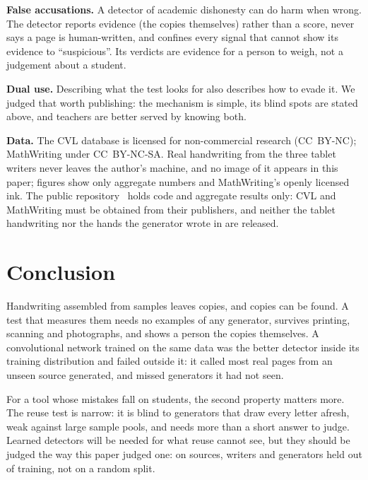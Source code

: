 \documentclass[conference]{IEEEtran}
\begin{document}
\textbf{False accusations.} A detector of academic dishonesty can do harm when wrong. The detector reports evidence
(the copies themselves) rather than a score, never says a page is human-written, and confines every signal that cannot
show its evidence to ``suspicious''. Its verdicts are evidence for a person to weigh, not a judgement about a student.

\textbf{Dual use.} Describing what the test looks for also describes how to evade it. We judged that worth publishing:
the mechanism is simple, its blind spots are stated above, and teachers are better served by knowing both.

\textbf{Data.} The CVL database is licensed for non-commercial research (CC~BY-NC); MathWriting under CC~BY-NC-SA. Real
handwriting from the three tablet writers never leaves the author's machine, and no image of it appears in this paper;
figures show only aggregate numbers and MathWriting's openly licensed ink. The public repository~\cite{inkcheck} holds
code and aggregate results only: CVL and MathWriting must be obtained from their publishers, and neither the tablet
handwriting nor the hands the generator wrote in are released.

\section{Conclusion}

Handwriting assembled from samples leaves copies, and copies can be found. A test that measures them needs no
examples of any generator, survives printing, scanning and photographs, and shows a person the copies themselves. A
convolutional network trained on the same data was the better detector inside its training distribution and failed
outside it: it called most real pages from an unseen source generated, and missed generators it had not seen.

For a tool whose mistakes fall on students, the second property matters more. The reuse test is narrow: it is blind to
generators that draw every letter afresh, weak against large sample pools, and needs more than a short answer to judge.
Learned detectors will be needed for what reuse cannot see, but they should be judged the way this paper judged
one: on sources, writers and generators held out of training, not on a random split.



\end{document}
